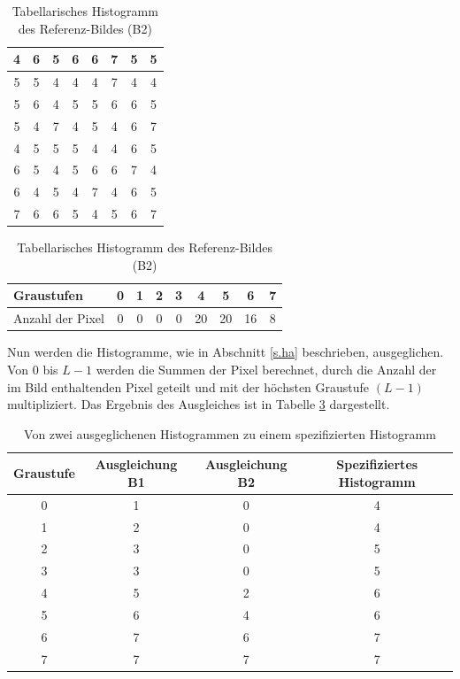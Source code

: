   \begin{table}
  [h]
  \caption{Tabellarisches Histogramm des Referenz-Bildes (B2)}
  \label{tab:b2}
  \centering
  \begin{minipage}{\textwidth}
  \center
  \begin{tabular}{|c|c|c|c|c|c|c|c|}
  \hline
  4&6&5&6&6&7&5&5\\
  \hline
  5&5&4&4&4&7&4&4\\
  \hline
  5&6&4&5&5&6&6&5\\
  \hline
  5&4&7&4&5&4&6&7\\
  \hline
  4&5&5&5&4&4&6&5\\
  \hline
  6&5&4&5&6&6&7&4\\
  \hline
  6&4&5&4&7&4&6&5\\
  \hline
  7&6&6&5&4&5&6&7\\  
  \hline
  \end{tabular}
  \end{minipage}
  \begin{minipage}{\textwidth}
  \hspace{\textwidth}
  \end{minipage}
  \begin{minipage}{\textwidth}
  \center
  \begin{tabular}{|l|c|c|c|c|c|c|c|c|}
  \hline
  Graustufen & 0 & 1 & 2 & 3 & 4 & 5 & 6 & 7\\
  \hline
  Anzahl der Pixel & 0 & 0 & 0 & 0 & 20 & 20 & 16 & 8\\
  \hline
  \end{tabular}
  \end{minipage}
  \end{table}
  \newpage
Nun werden die Histogramme, wie in Abschnitt \ref{s.ha} beschrieben, ausgeglichen. Von 0 bis $L-1$ werden die Summen der Pixel berechnet, durch die Anzahl der im Bild enthaltenden Pixel geteilt und mit der höchsten Graustufe $(L-1)$ multipliziert. Das Ergebnis des Ausgleiches ist in Tabelle \ref{tab:hs} dargestellt.
\begin{table}
  [h]
  \caption{Von zwei ausgeglichenen Histogrammen zu einem spezifizierten Histogramm}
  \label{tab:hs}
  \centering
  \begin{tabular}{|c|c|c|c|}
  \hline
  Graustufe & Ausgleichung B1 & Ausgleichung B2 & Spezifiziertes Histogramm\\
  \hline
  0 & 1 & 0 & 4\\
  \hline
  1 & 2 & 0 & 4\\
  \hline
  2 & 3 & 0 & 5\\
  \hline
  3 & 3 & 0 & 5\\
  \hline
  4 & 5 & 2 & 6\\
  \hline
  5 & 6 & 4 & 6\\
  \hline
  6 & 7 & 6 & 7\\
  \hline
  7 & 7 & 7 & 7\\
  \hline
  \end{tabular}
  \end{table}
